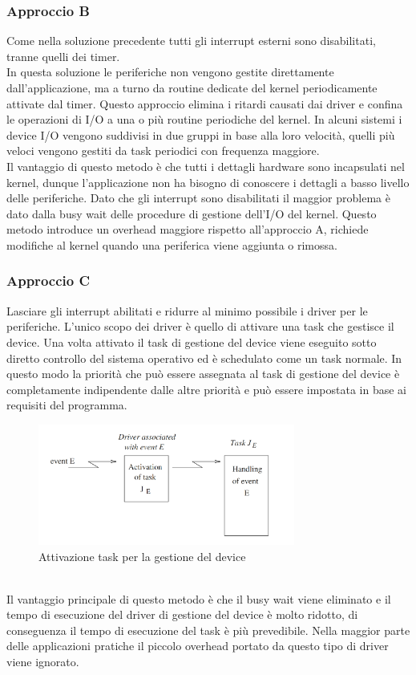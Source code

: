 \documentclass[12pt]{article}
\begin{document}
\subsubsection{Approccio B}
Come nella soluzione precedente tutti gli interrupt esterni sono disabilitati,
tranne quelli dei timer.\\
In questa soluzione le periferiche non vengono gestite direttamente dall'applicazione, ma a turno da routine dedicate del kernel 
periodicamente attivate dal timer.
Questo approccio elimina i ritardi causati dai driver e confina le operazioni di I/O a una o più routine periodiche del kernel.
In alcuni sistemi i device I/O vengono suddivisi in due gruppi in base alla loro velocità, quelli più veloci vengono gestiti da task 
periodici con frequenza maggiore.
\\
Il vantaggio di questo metodo è che tutti i dettagli hardware sono incapsulati nel kernel, dunque l'applicazione non ha bisogno di 
conoscere i dettagli a basso livello delle periferiche.
Dato che gli interrupt sono disabilitati il maggior problema è dato dalla busy wait delle procedure di gestione dell'I/O del kernel.
Questo metodo introduce un overhead maggiore rispetto all'approccio A, richiede modifiche al kernel quando una periferica viene aggiunta o rimossa.
\subsubsection{Approccio C}
Lasciare gli interrupt abilitati e ridurre al minimo possibile i driver per le periferiche.
L'unico scopo dei driver è quello di attivare una task che gestisce il device. Una volta attivato il task di gestione del device 
viene eseguito sotto diretto controllo del sistema operativo
ed è schedulato come un task normale.
In questo modo la priorità che può essere assegnata al task di gestione del device è completamente indipendente dalle altre priorità 
e può essere impostata in base ai requisiti del programma.
\begin{figure}[h]
\centering
\includegraphics[height=150px]{pictures/approccioC.png}
\caption{Attivazione task per la gestione del device}
\end{figure}
\\
Il vantaggio principale di questo metodo è che il busy wait viene eliminato e il tempo di esecuzione del driver di gestione del device è 
molto ridotto, di conseguenza il tempo di esecuzione del task è più prevedibile.
Nella maggior parte delle applicazioni pratiche il piccolo overhead portato da questo tipo di driver viene ignorato.
\end{document}
